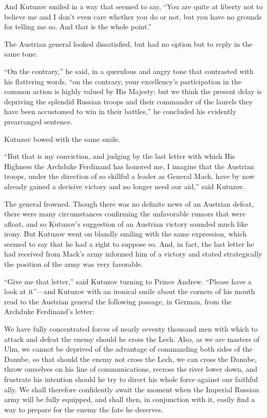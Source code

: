 And Kutuzov smiled in a way that seemed to say, ``You are quite
at liberty not to believe me and I don't even care whether you do
or not, but you have no grounds for telling me so. And that is
the whole point.''

The Austrian general looked dissatisfied, but had no option but
to reply in the same tone.

``On the contrary,'' he said, in a querulous and angry tone that
contrasted with his flattering words, ``on the contrary, your
excellency's participation in the common action is highly valued
by His Majesty; but we think the present delay is depriving the
splendid Russian troops and their commander of the laurels they
have been accustomed to win in their battles,'' he concluded his
evidently prearranged sentence.

Kutuzov bowed with the same smile.

``But that is my conviction, and judging by the last letter with
which His Highness the Archduke Ferdinand has honored me, I
imagine that the Austrian troops, under the direction of so
skillful a leader as General Mack, have by now already gained a
decisive victory and no longer need our aid,'' said Kutuzov.

The general frowned. Though there was no definite news of an
Austrian defeat, there were many circumstances confirming the
unfavorable rumors that were afloat, and so Kutuzov's suggestion
of an Austrian victory sounded much like irony. But Kutuzov went
on blandly smiling with the same expression, which seemed to say
that he had a right to suppose so.  And, in fact, the last letter
he had received from Mack's army informed him of a victory and
stated strategically the position of the army was very favorable.

``Give me that letter,'' said Kutuzov turning to Prince
Andrew. ``Please have a look at it''---and Kutuzov with an
ironical smile about the corners of his mouth read to the
Austrian general the following passage, in German, from the
Archduke Ferdinand's letter:

We have fully concentrated forces of nearly seventy thousand men
with which to attack and defeat the enemy should he cross the
Lech. Also, as we are masters of Ulm, we cannot be deprived of
the advantage of commanding both sides of the Danube, so that
should the enemy not cross the Lech, we can cross the Danube,
throw ourselves on his line of communications, recross the river
lower down, and frustrate his intention should he try to direct
his whole force against our faithful ally. We shall therefore
confidently await the moment when the Imperial Russian army will
be fully equipped, and shall then, in conjunction with it, easily
find a way to prepare for the enemy the fate he deserves.

